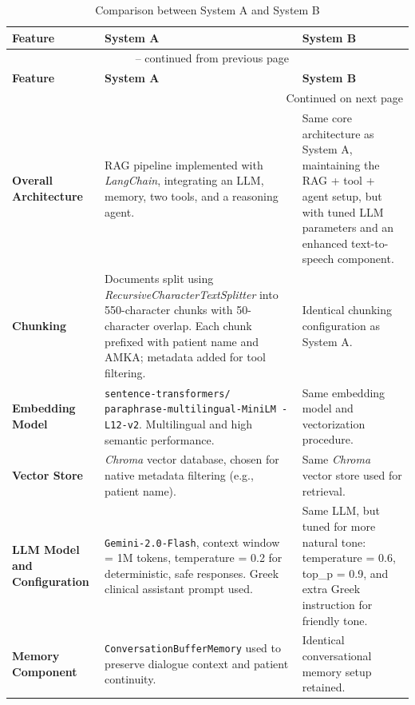 \begin{longtable}{|p{3cm}|p{6.5cm}|p{6.5cm}|}
\caption{Comparison between System A and System B} \\
\hline
\textbf{Feature} & \textbf{System A} & \textbf{System B} \\
\hline
\endfirsthead
\multicolumn{3}{c}{{\tablename\ \thetable{} -- continued from previous page}} \\
\hline
\textbf{Feature} & \textbf{System A} & \textbf{System B} \\
\hline
\endhead
\hline \multicolumn{3}{r}{{Continued on next page}} \\
\endfoot
\hline
\endlastfoot

\textbf{Overall Architecture} &
RAG pipeline implemented with \textit{LangChain}, integrating an LLM, memory, two tools, and a reasoning agent. &
Same core architecture as System A, maintaining the RAG + tool + agent setup, but with tuned LLM parameters and an enhanced text-to-speech component. \\
\hline

\textbf{Chunking} &
Documents split using \textit{RecursiveCharacterTextSplitter} into 550-character chunks with 50-character overlap. Each chunk prefixed with patient name and AMKA; metadata added for tool filtering. &
Identical chunking configuration as System A. \\
\hline

\textbf{Embedding Model} &
\texttt{sentence-transformers/
paraphrase-multilingual-MiniLM
-L12-v2}. Multilingual and high semantic performance. &
Same embedding model and vectorization procedure. \\
\hline

\textbf{Vector Store} &
\textit{Chroma} vector database, chosen for native metadata filtering (e.g., patient name). &
Same \textit{Chroma} vector store used for retrieval. \\
\hline

\textbf{LLM Model and Configuration} &
\texttt{Gemini-2.0-Flash}, context window = 1M tokens, temperature = 0.2 for deterministic, safe responses. Greek clinical assistant prompt used. &
Same LLM, but tuned for more natural tone: temperature = 0.6, top\_p = 0.9, and extra Greek instruction for friendly tone. \\
\hline

\textbf{Memory Component} &
\texttt{ConversationBufferMemory} used to preserve dialogue context and patient continuity. &
Identical conversational memory setup retained. \\
\hline


\end{longtable}
